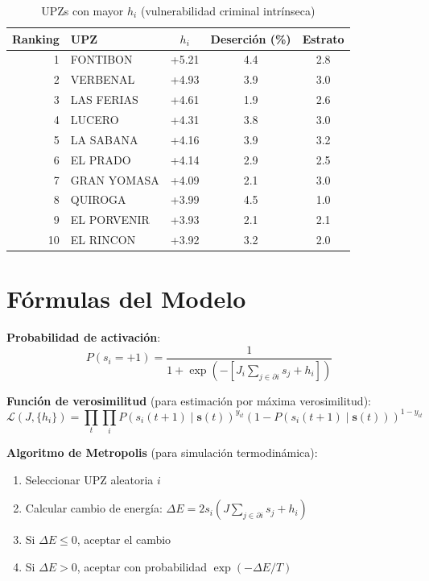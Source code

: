 \documentclass[12pt,a4paper]{article}
\begin{document}
\begin{table}[H]
\centering
\caption{UPZs con mayor $h_i$ (vulnerabilidad criminal intrínseca)}
\label{tab:top10}
\begin{tabular}{@{}rlccc@{}}
\toprule
\textbf{Ranking} & \textbf{UPZ} & \textbf{$h_i$} & \textbf{Deserción (\%)} & \textbf{Estrato} \\
\midrule
1 & FONTIBON & +5.21 & 4.4 & 2.8 \\
2 & VERBENAL & +4.93 & 3.9 & 3.0 \\
3 & LAS FERIAS & +4.61 & 1.9 & 2.6 \\
4 & LUCERO & +4.31 & 3.8 & 3.0 \\
5 & LA SABANA & +4.16 & 3.9 & 3.2 \\
6 & EL PRADO & +4.14 & 2.9 & 2.5 \\
7 & GRAN YOMASA & +4.09 & 2.1 & 3.0 \\
8 & QUIROGA & +3.99 & 4.5 & 1.0 \\
9 & EL PORVENIR & +3.93 & 2.1 & 2.1 \\
10 & EL RINCON & +3.92 & 3.2 & 2.0 \\
\bottomrule
\end{tabular}
\end{table}

\section{Fórmulas del Modelo}

\textbf{Probabilidad de activación}:
\begin{equation}
P(s_i=+1) = \frac{1}{1 + \exp\left(-\left[J_i \sum_{j \in \partial i} s_j + h_i\right]\right)}
\end{equation}

\textbf{Función de verosimilitud} (para estimación por máxima verosimilitud):
\begin{equation}
\mathcal{L}(J, \{h_i\}) = \prod_{t} \prod_{i} P(s_i(t+1) \mid \mathbf{s}(t))^{y_{it}} (1 - P(s_i(t+1) \mid \mathbf{s}(t)))^{1-y_{it}}
\end{equation}

\textbf{Algoritmo de Metropolis} (para simulación termodinámica):
\begin{enumerate}
    \item Seleccionar UPZ aleatoria $i$
    \item Calcular cambio de energía: $\Delta E = 2s_i\left(J\sum_{j \in \partial i} s_j + h_i\right)$
    \item Si $\Delta E \leq 0$, aceptar el cambio
    \item Si $\Delta E > 0$, aceptar con probabilidad $\exp(-\Delta E / T)$
\end{enumerate}
\end{document}

